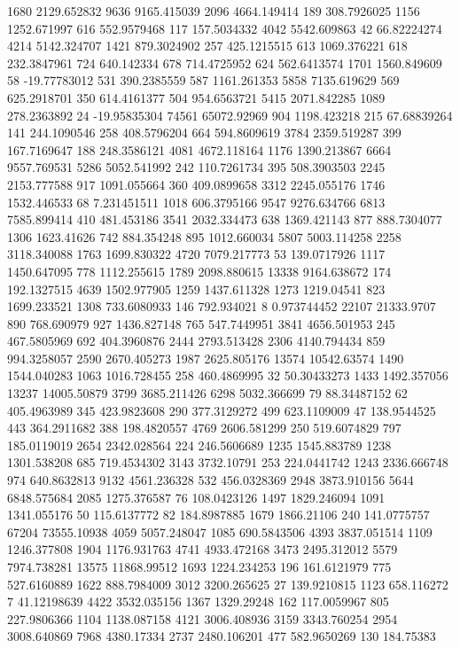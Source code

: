 1680	2129.652832
9636	9165.415039
2096	4664.149414
189	308.7926025
1156	1252.671997
616	552.9579468
117	157.5034332
4042	5542.609863
42	66.82224274
4214	5142.324707
1421	879.3024902
257	425.1215515
613	1069.376221
618	232.3847961
724	640.142334
678	714.4725952
624	562.6413574
1701	1560.849609
58	-19.77783012
531	390.2385559
587	1161.261353
5858	7135.619629
569	625.2918701
350	614.4161377
504	954.6563721
5415	2071.842285
1089	278.2363892
24	-19.95835304
74561	65072.92969
904	1198.423218
215	67.68839264
141	244.1090546
258	408.5796204
664	594.8609619
3784	2359.519287
399	167.7169647
188	248.3586121
4081	4672.118164
1176	1390.213867
6664	9557.769531
5286	5052.541992
242	110.7261734
395	508.3903503
2245	2153.777588
917	1091.055664
360	409.0899658
3312	2245.055176
1746	1532.446533
68	7.231451511
1018	606.3795166
9547	9276.634766
6813	7585.899414
410	481.453186
3541	2032.334473
638	1369.421143
877	888.7304077
1306	1623.41626
742	884.354248
895	1012.660034
5807	5003.114258
2258	3118.340088
1763	1699.830322
4720	7079.217773
53	139.0717926
1117	1450.647095
778	1112.255615
1789	2098.880615
13338	9164.638672
174	192.1327515
4639	1502.977905
1259	1437.611328
1273	1219.04541
823	1699.233521
1308	733.6080933
146	792.934021
8	0.973744452
22107	21333.9707
890	768.690979
927	1436.827148
765	547.7449951
3841	4656.501953
245	467.5805969
692	404.3960876
2444	2793.513428
2306	4140.794434
859	994.3258057
2590	2670.405273
1987	2625.805176
13574	10542.63574
1490	1544.040283
1063	1016.728455
258	460.4869995
32	50.30433273
1433	1492.357056
13237	14005.50879
3799	3685.211426
6298	5032.366699
79	88.34487152
62	405.4963989
345	423.9823608
290	377.3129272
499	623.1109009
47	138.9544525
443	364.2911682
388	198.4820557
4769	2606.581299
250	519.6074829
797	185.0119019
2654	2342.028564
224	246.5606689
1235	1545.883789
1238	1301.538208
685	719.4534302
3143	3732.10791
253	224.0441742
1243	2336.666748
974	640.8632813
9132	4561.236328
532	456.0328369
2948	3873.910156
5644	6848.575684
2085	1275.376587
76	108.0423126
1497	1829.246094
1091	1341.055176
50	115.6137772
82	184.8987885
1679	1866.21106
240	141.0775757
67204	73555.10938
4059	5057.248047
1085	690.5843506
4393	3837.051514
1109	1246.377808
1904	1176.931763
4741	4933.472168
3473	2495.312012
5579	7974.738281
13575	11868.99512
1693	1224.234253
196	161.6121979
775	527.6160889
1622	888.7984009
3012	3200.265625
27	139.9210815
1123	658.116272
7	41.12198639
4422	3532.035156
1367	1329.29248
162	117.0059967
805	227.9806366
1104	1138.087158
4121	3006.408936
3159	3343.760254
2954	3008.640869
7968	4380.17334
2737	2480.106201
477	582.9650269
130	184.75383
